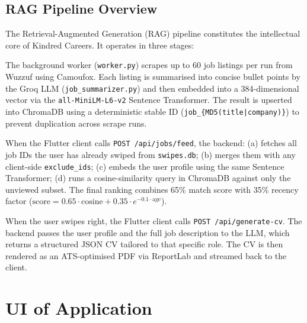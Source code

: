 \documentclass[12pt, a4paper, oneside]{report}
\begin{document}
\subsection*{RAG Pipeline Overview}

The Retrieval-Augmented Generation (RAG) pipeline constitutes the intellectual core of Kindred
Careers. It operates in three stages:

\begin{description}[leftmargin=2cm, style=nextline, itemsep=6pt]
  \item[Stage 1 — Ingest]
        The background worker (\texttt{worker.py}) scrapes up to 60 job listings per run from
        Wuzzuf using Camoufox. Each listing is summarised into concise bullet points by the Groq
        LLM (\texttt{job\_summarizer.py}) and then embedded into a 384-dimensional vector via the
        \texttt{all-MiniLM-L6-v2} Sentence Transformer. The result is upserted into ChromaDB using
        a deterministic stable ID (\texttt{job\_\{MD5(title|company)\}}) to prevent duplication
        across scrape runs.

  \item[Stage 2 — Retrieve]
        When the Flutter client calls \texttt{POST /api/jobs/feed}, the backend:
        (a) fetches all job IDs the user has already swiped from \texttt{swipes.db};
        (b) merges them with any client-side \texttt{exclude\_ids};
        (c) embeds the user profile using the same Sentence Transformer;
        (d) runs a cosine-similarity query in ChromaDB against only the unviewed subset.
        The final ranking combines 65\% match score with 35\% recency factor
        ($\text{score} = 0.65 \cdot \text{cosine} + 0.35 \cdot e^{-0.1 \cdot \text{age}}$).

  \item[Stage 3 — Generate]
        When the user swipes right, the Flutter client calls \texttt{POST /api/generate-cv}. The
        backend passes the user profile and the full job description to the LLM, which returns a
        structured JSON CV tailored to that specific role. The CV is then rendered as an
        ATS-optimised PDF via ReportLab and streamed back to the client.
\end{description}

\section{UI of Application}
\label{sec:ui}
\end{document}
